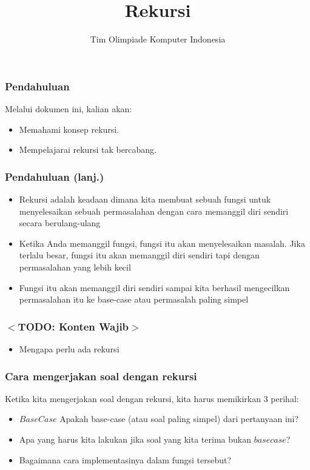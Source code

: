 

\title{Rekursi}
\author{Tim Olimpiade Komputer Indonesia}
\date{}



\begin{frame}
\titlepage
\end{frame}

\begin{frame}
\frametitle{Pendahuluan}
Melalui dokumen ini, kalian akan:
\begin{itemize}
  \item Memahami konsep rekursi.
  \item Mempelajarai rekursi tak bercabang.
\end{itemize}
\end{frame}

\begin{frame}
\frametitle{Pendahuluan (lanj.) }
\begin{itemize}
  \item Rekursi adalah keadaan dimana kita membuat sebuah fungsi untuk menyelesaikan sebuah permasalahan dengan cara memanggil diri sendiri secara berulang-ulang
  \item Ketika Anda memanggil fungsi, fungsi itu akan menyelesaikan masalah. Jika terlalu besar, fungsi itu akan memanggil diri sendiri tapi dengan permasalahan yang lebih kecil
  \item Fungsi itu akan memanggil diri sendiri sampai kita berhasil mengecilkan permasalahan itu ke base-case atau permasalah paling simpel
\end{itemize}
\end{frame}

\begin{frame}
\frametitle{$<$TODO: Konten Wajib$>$}
\begin{itemize}
  \item Mengapa perlu ada rekursi
\end{itemize}
\end{frame}

\begin{frame}
\frametitle{Cara mengerjakan soal dengan rekursi }
Ketika kita mengerjakan soal dengan rekursi, kita harus memikirkan 3 perihal:
\begin{itemize}
  \item $Base Case$ Apakah base-case (atau soal paling simpel) dari pertanyaan ini?
  \item Apa yang harus kita lakukan jika soal yang kita terima bukan $base case$?
  \item Bagaimana cara implementasinya dalam fungsi tersebut?
\end{itemize}
\end{frame}

